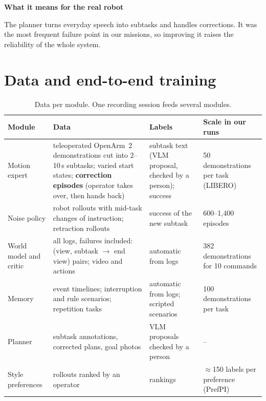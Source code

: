 \documentclass[11pt,a4paper]{article}
\newcommand{\sub}[1]{\par\needspace{4\baselineskip}\smallskip\noindent\textbf{#1}\par}
\begin{document}
\sub{What it means for the real robot}
The planner turns everyday speech into subtasks and handles corrections. It was the most frequent failure point in our missions, so improving it raises the reliability of the whole system.

\section{Data and end-to-end training}
\label{sec:data}
\begin{table}[!htbp]\centering\small
\begin{tabularx}{\textwidth}{P{2.6cm}YP{3.2cm}P{3.0cm}}
\toprule
Module & Data & Labels & Scale in our runs \\
\midrule
Motion expert & teleoperated OpenArm~2 demonstrations cut into 2--10\,s subtasks; varied start states; \textbf{correction episodes} (operator takes over, then hands back) & subtask text (VLM proposal, checked by a person); success & 50 demonstrations per task (LIBERO) \\
Noise policy & robot rollouts with mid-task changes of instruction; retraction rollouts & success of the new subtask & 600--1,400 episodes \\
World model and critic & all logs, failures included: (view, subtask $\rightarrow$ end view) pairs; video and actions & automatic from logs & 382 demonstrations for 10 commands \\
Memory & event timelines; interruption and rule scenarios; repetition tasks & automatic from logs; scripted scenarios & 100 demonstrations per task \\
Planner & subtask annotations, corrected plans, goal photos & VLM proposals checked by a person & -- \\
Style preferences & rollouts ranked by an operator & rankings & $\approx$150 labels per preference (PrefPI) \\
\bottomrule
\end{tabularx}
\caption{Data per module. One recording session feeds several modules.}
\label{tab:data}
\end{table}
\end{document}
